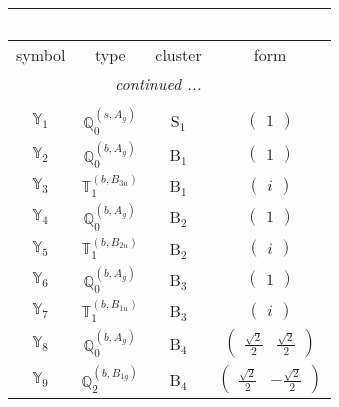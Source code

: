 \documentclass[fleqn,10pt,landscape]{article}
\begin{document}
\begin{itemize}
\begin{center}
\begin{longtable}{c|c|c|c}
\multicolumn{3}{l}{\tablename\ \thetable{}} \\
 \hline \hline
symbol & type & cluster & form \\ \hline \endhead

 \hline \hline
\multicolumn{3}{r}{\footnotesize\it continued ...} \\ \endfoot

 \hline \hline
\multicolumn{3}{r}{} \\ \endlastfoot

$ \mathbb{Y}_{1} $ & $\mathbb{Q}_{0}^{(s,A_{g})}$ & S$_{1}$ & $\begin{pmatrix} 1 \end{pmatrix}$ \\ \hline
$ \mathbb{Y}_{2} $ & $\mathbb{Q}_{0}^{(b,A_{g})}$ & B$_{1}$ & $\begin{pmatrix} 1 \end{pmatrix}$ \\
$ \mathbb{Y}_{3} $ & $\mathbb{T}_{1}^{(b,B_{3u})}$ & B$_{1}$ & $\begin{pmatrix} i \end{pmatrix}$ \\ \hline
$ \mathbb{Y}_{4} $ & $\mathbb{Q}_{0}^{(b,A_{g})}$ & B$_{2}$ & $\begin{pmatrix} 1 \end{pmatrix}$ \\
$ \mathbb{Y}_{5} $ & $\mathbb{T}_{1}^{(b,B_{2u})}$ & B$_{2}$ & $\begin{pmatrix} i \end{pmatrix}$ \\ \hline
$ \mathbb{Y}_{6} $ & $\mathbb{Q}_{0}^{(b,A_{g})}$ & B$_{3}$ & $\begin{pmatrix} 1 \end{pmatrix}$ \\
$ \mathbb{Y}_{7} $ & $\mathbb{T}_{1}^{(b,B_{1u})}$ & B$_{3}$ & $\begin{pmatrix} i \end{pmatrix}$ \\ \hline
$ \mathbb{Y}_{8} $ & $\mathbb{Q}_{0}^{(b,A_{g})}$ & B$_{4}$ & $\begin{pmatrix} \frac{\sqrt{2}}{2} & \frac{\sqrt{2}}{2} \end{pmatrix}$ \\
$ \mathbb{Y}_{9} $ & $\mathbb{Q}_{2}^{(b,B_{1g})}$ & B$_{4}$ & $\begin{pmatrix} \frac{\sqrt{2}}{2} & - \frac{\sqrt{2}}{2} \end{pmatrix}$ \\

\end{longtable}
\end{center}
\end{itemize}
\end{document}
